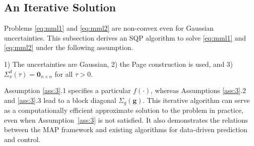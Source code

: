 \documentclass{ifacconf}
\begin{document}
\subsection{An Iterative Solution}
\label{sec:iter}

Problems \eqref{eq:mml1} and \eqref{eq:mml2} are non-convex even for Gaussian uncertainties. This subsection derives an SQP algorithm to solve \eqref{eq:mml1} and \eqref{eq:mml2} under the following assumption.
\begin{assum}
1) The uncertainties are Gaussian, 2) the Page construction is used, and 3) $\Sigma_\nu^d(\tau)=\mathbf{0}_{n\times n}$ for all $\tau>0$.
\label{ass:3}
\end{assum}
Assumption \ref{ass:3}.1 specifies a particular $f(\cdot)$, whereas Assumptions \ref{ass:3}.2 and \ref{ass:3}.3 lead to a block diagonal $\Sigma_g(\mathbf{g})$. This iterative algorithm can serve as a computationally efficient approximate solution to the problem in practice, even when Assumption~\ref{ass:3} is not satisfied. It also demonstrates the relations between the MAP framework and existing algorithms for data-driven prediction and control.
\end{document}
